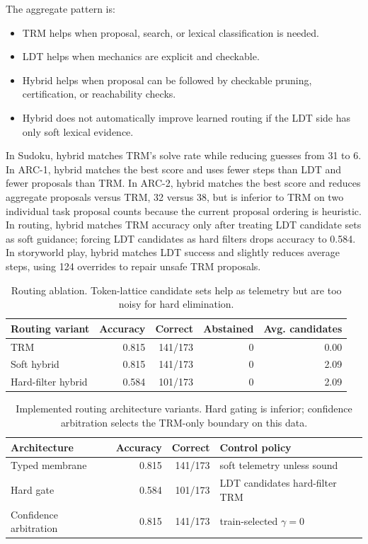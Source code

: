 \documentclass[11pt]{article}
\begin{document}
The aggregate pattern is:
\begin{itemize}
  \item TRM helps when proposal, search, or lexical classification is needed.
  \item LDT helps when mechanics are explicit and checkable.
  \item Hybrid helps when proposal can be followed by checkable pruning, certification, or reachability checks.
  \item Hybrid does not automatically improve learned routing if the LDT side has only soft lexical evidence.
\end{itemize}

In Sudoku, hybrid matches TRM's solve rate while reducing guesses from 31 to 6. In ARC-1, hybrid matches the best score and uses fewer steps than LDT and fewer proposals than TRM. In ARC-2, hybrid matches the best score and reduces aggregate proposals versus TRM, 32 versus 38, but is inferior to TRM on two individual task proposal counts because the current proposal ordering is heuristic. In routing, hybrid matches TRM accuracy only after treating LDT candidate sets as soft guidance; forcing LDT candidates as hard filters drops accuracy to 0.584. In storyworld play, hybrid matches LDT success and slightly reduces average steps, using 124 overrides to repair unsafe TRM proposals.

\begin{table}[t]
\centering
\begin{tabular}{lrrrr}
\toprule
Routing variant & Accuracy & Correct & Abstained & Avg. candidates \\
\midrule
TRM & 0.815 & 141/173 & 0 & 0.00 \\
Soft hybrid & 0.815 & 141/173 & 0 & 2.09 \\
Hard-filter hybrid & 0.584 & 101/173 & 0 & 2.09 \\
\bottomrule
\end{tabular}
\caption{Routing ablation. Token-lattice candidate sets help as telemetry but are too noisy for hard elimination.}
\label{tab:routing-ablation}
\end{table}

\begin{table}[t]
\centering
\begin{tabular}{lrrl}
\toprule
Architecture & Accuracy & Correct & Control policy \\
\midrule
Typed membrane & 0.815 & 141/173 & soft telemetry unless sound \\
Hard gate & 0.584 & 101/173 & LDT candidates hard-filter TRM \\
Confidence arbitration & 0.815 & 141/173 & train-selected $\gamma=0$ \\
\bottomrule
\end{tabular}
\caption{Implemented routing architecture variants. Hard gating is inferior; confidence arbitration selects the TRM-only boundary on this data.}
\label{tab:architecture-variants}
\end{table}
\end{document}
